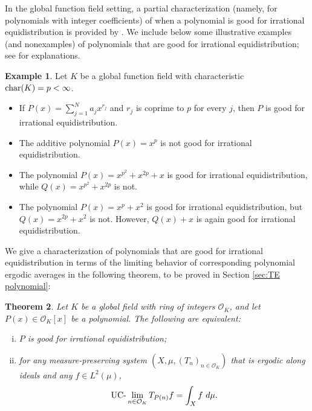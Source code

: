 \documentclass{amsart}
\newtheorem{theorem}{Theorem}[section]
\theoremstyle{definition}
\newtheorem{example}[theorem]{Example}
\numberwithin{equation}{section}
\newcommand{\mO}{\mathcal{O}}
\newcommand{\UClim}{\textup{UC-}\lim}
\renewcommand{\char}{\textup{char}}
\begin{document}
In the global function field setting, a partial characterization (namely, for polynomials with integer coefficients) of when a polynomial is good for irrational equidistribution is provided by \cite[Theorem 1.15]{ab_Sarkozy}.
We include below some illustrative examples (and nonexamples) of polynomials that are good for irrational equidistribution; see \cite[Theorem 1.15 and Example 1.16]{ab_Sarkozy} for explanations.

\begin{example} \label{eg: irrational equidistribution}
    Let $K$ be a global function field with characteristic $\char(K) = p < \infty$.
    \begin{itemize}
        \item If $P(x) = \sum_{j=1}^N a_j x^{r_j}$ and $r_j$ is coprime to $p$ for every $j$, then $P$ is good for irrational equidistribution.
        \item The additive polynomial $P(x) = x^p$ is not good for irrational equidistribution.
        \item The polynomial $P(x) = x^{p^2} + x^{2p} + x$ is good for irrational equidistribution, while $Q(x) = x^{p^2} + x^{2p}$ is not.
        \item The polynomial $P(x) = x^p + x^2$ is good for irrational equidistribution, but $Q(x) = x^{2p} + x^2$ is not.
        However, $Q(x) + x$ is again good for irrational equidistribution.
    \end{itemize}
\end{example}

We give a characterization of polynomials that are good for irrational equidistribution in terms of the limiting behavior of corresponding polynomial ergodic averages in the following theorem, to be proved in Section \ref{sec:TE polynomial}:

\begin{theorem} \label{thm: TE + ud}
    Let $K$ be a global field with ring of integers $\mO_K$, and let $P(x) \in \mO_K[x]$ be a polynomial.
    The following are equivalent:
    \begin{enumerate}[(i)]
        \item $P$ is good for irrational equidistribution;
        \item for any measure-preserving system $(X, \mu, (T_n)_{n \in \mO_K})$ that is ergodic along ideals and any $f \in L^2(\mu)$,
            \begin{equation*}
                \UClim_{n \in \mO_K} T_{P(n)}f = \int_X f~d\mu.
            \end{equation*}
    \end{enumerate}
\end{theorem}
\end{document}
